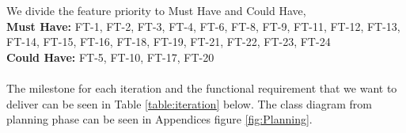 \documentclass[11pt]{article}
\begin{document}
\begin{itemize}
\noindent We divide the feature priority to Must Have and Could Have, 
\\
\textbf{Must Have:} FT-1, FT-2, FT-3, FT-4, FT-6, FT-8, FT-9, FT-11, FT-12, FT-13, FT-14, FT-15, FT-16, FT-18, FT-19, FT-21, FT-22, FT-23, FT-24
\\
\textbf{Could Have:} FT-5, FT-10, FT-17, FT-20
\\ \\
The milestone for each iteration and the functional requirement that we want to deliver can be seen in Table \ref{table:iteration} below. The class diagram from planning phase can be seen in Appendices figure \ref{fig:Planning}.

\begin{center}

		
		
		
		
		
		


\end{center}
\end{itemize}
\end{document}
